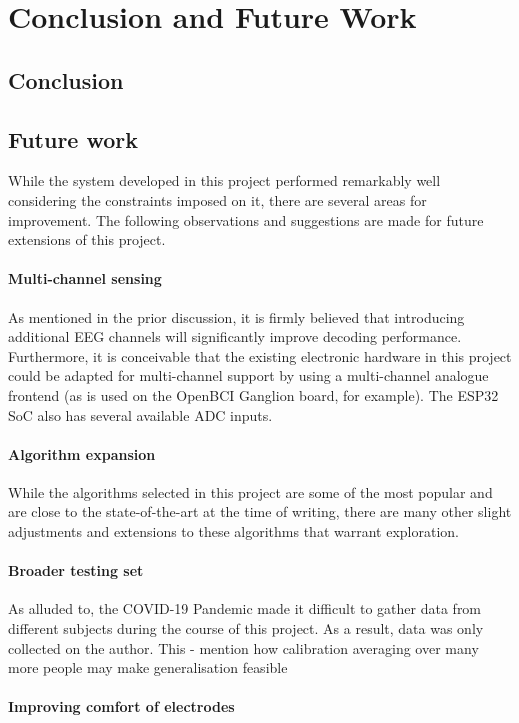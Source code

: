 \chapter{Conclusion and Future Work}
\label{chapter:conclusion}

\section{Conclusion}

\section{Future work}
While the system developed in this project performed remarkably well considering the constraints imposed on it, there are several areas for improvement. The following observations and suggestions are made for future extensions of this project. 

\subsubsection{Multi-channel sensing}
As mentioned in the prior discussion, it is firmly believed that introducing additional EEG channels will significantly improve decoding performance. Furthermore, it is conceivable that the existing electronic hardware in this project could be adapted for multi-channel support by using a multi-channel analogue frontend (as is used on the OpenBCI Ganglion board, for example). The ESP32 SoC also has several available ADC inputs.

\subsubsection{Algorithm expansion}
While the algorithms selected in this project are some of the most popular and are close to the state-of-the-art at the time of writing, there are many other slight adjustments and extensions to these algorithms that warrant exploration. 

\subsubsection{Broader testing set}
As alluded to, the COVID-19 Pandemic made it difficult to gather data from different subjects during the course of this project. As a result, data was only collected on the author. This 
- mention how calibration averaging over many more people may make generalisation feasible



\subsubsection{Improving comfort of electrodes}